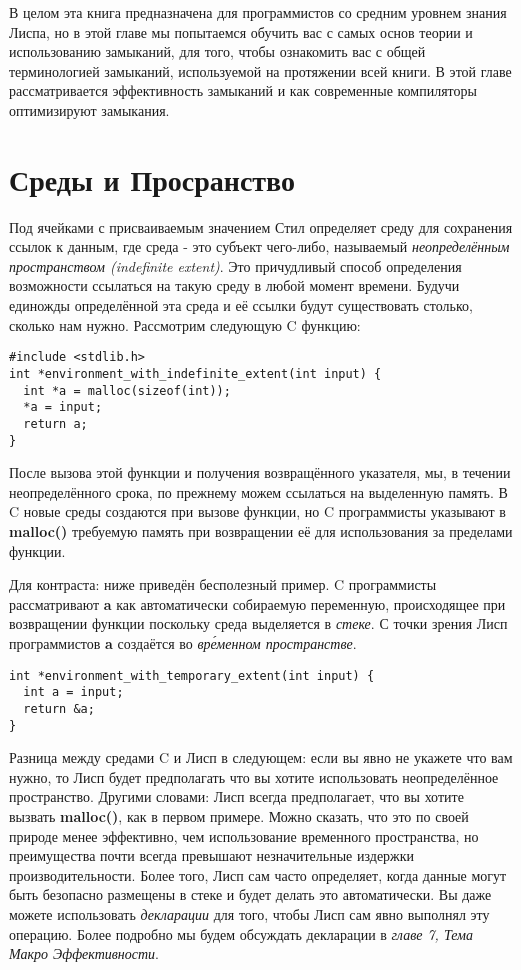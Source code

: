 В целом эта книга предназначена для программистов со средним уровнем знания Лиспа, но в этой главе мы попытаемся обучить вас с самых основ теории и использованию замыканий, для того, чтобы ознакомить вас с общей терминологией замыканий, используемой на протяжении всей книги. В этой главе рассматривается эффективность замыканий и как современные компиляторы оптимизируют замыкания.

\section{Среды и Просранство}\label{section_environments_and_extent}

Под ячейками с присваиваемым значением Стил определяет среду для сохранения ссылок к данным, где среда - это субъект чего-либо, называемый \emph{неопределённым пространством (indefinite extent)}. Это причудливый способ определения возможности ссылаться на такую среду в любой момент времени. Будучи единожды определённой эта среда и её ссылки будут существовать столько, сколько нам нужно. Рассмотрим следующую C функцию:

\begin{verbatim}
#include <stdlib.h>
int *environment_with_indefinite_extent(int input) {
  int *a = malloc(sizeof(int));
  *a = input;
  return a;
}
\end{verbatim}

После вызова этой функции и получения возвращённого указателя, мы, в течении неопределённого срока, по прежнему можем ссылаться на выделенную память. В C новые среды создаются при вызове функции, но C программисты указывают в \textbf{malloc()} требуемую память при возвращении её для использования за пределами функции.

Для контраста: ниже приведён бесполезный пример. C программисты рассматривают \textbf{a} как автоматически собираемую переменную, происходящее при возвращении функции поскольку среда выделяется в \emph{стеке}. С точки зрения Лисп программистов \textbf{a} создаётся во \emph{вр\'{е}менном пространстве}.

\begin{verbatim}
int *environment_with_temporary_extent(int input) {
  int a = input;
  return &a;
}
\end{verbatim}

Разница между средами C и Лисп в следующем: если вы явно не укажете что вам нужно, то Лисп будет предполагать что вы хотите использовать неопределённое пространство. Другими словами: Лисп всегда предполагает, что вы хотите вызвать \textbf{malloc()}, как в первом примере. Можно сказать, что это по своей природе менее эффективно, чем использование временного пространства, но преимущества почти всегда превышают незначительные издержки производительности. Более того, Лисп сам часто определяет, когда данные могут быть безопасно размещены в стеке и будет делать это автоматически. Вы даже можете использовать \emph{декларации} для того, чтобы Лисп сам явно выполнял эту операцию. Более подробно мы будем обсуждать декларации в \emph{главе 7, Тема Макро Эффективности}.

